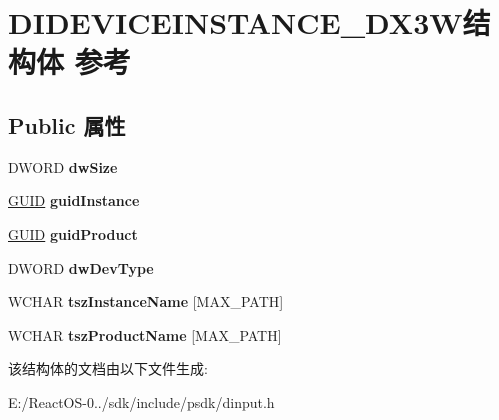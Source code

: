 \hypertarget{struct_d_i_d_e_v_i_c_e_i_n_s_t_a_n_c_e___d_x3_w}{}\section{D\+I\+D\+E\+V\+I\+C\+E\+I\+N\+S\+T\+A\+N\+C\+E\+\_\+\+D\+X3\+W结构体 参考}
\label{struct_d_i_d_e_v_i_c_e_i_n_s_t_a_n_c_e___d_x3_w}
\subsection*{Public 属性}
\begin{DoxyCompactItemize}
\item 
\mbox{\label{struct_d_i_d_e_v_i_c_e_i_n_s_t_a_n_c_e___d_x3_w_a496ff115e090892f909f809328e9463b}} 
D\+W\+O\+RD {\bfseries dw\+Size}
\item 
\mbox{\label{struct_d_i_d_e_v_i_c_e_i_n_s_t_a_n_c_e___d_x3_w_a0bd5723893b29b38dcd6de869c8b793c}} 
\hyperlink{interface_g_u_i_d}{G\+U\+ID} {\bfseries guid\+Instance}
\item 
\mbox{\label{struct_d_i_d_e_v_i_c_e_i_n_s_t_a_n_c_e___d_x3_w_a200f769ab9387fdd9e29a5e09bc7fe29}} 
\hyperlink{interface_g_u_i_d}{G\+U\+ID} {\bfseries guid\+Product}
\item 
\mbox{\label{struct_d_i_d_e_v_i_c_e_i_n_s_t_a_n_c_e___d_x3_w_afe081f0188f6d9a36a9d7645c5803326}} 
D\+W\+O\+RD {\bfseries dw\+Dev\+Type}
\item 
\mbox{\label{struct_d_i_d_e_v_i_c_e_i_n_s_t_a_n_c_e___d_x3_w_a488068bcea4b2998769e1b9670c4fbbd}} 
W\+C\+H\+AR {\bfseries tsz\+Instance\+Name} \mbox{[}M\+A\+X\+\_\+\+P\+A\+TH\mbox{]}
\item 
\mbox{\label{struct_d_i_d_e_v_i_c_e_i_n_s_t_a_n_c_e___d_x3_w_a5591863134fef848106d4b8e27d562a3}} 
W\+C\+H\+AR {\bfseries tsz\+Product\+Name} \mbox{[}M\+A\+X\+\_\+\+P\+A\+TH\mbox{]}
\end{DoxyCompactItemize}


该结构体的文档由以下文件生成\+:\begin{DoxyCompactItemize}
\item 
E\+:/\+React\+O\+S-\/0../sdk/include/psdk/dinput.\+h\end{DoxyCompactItemize}
